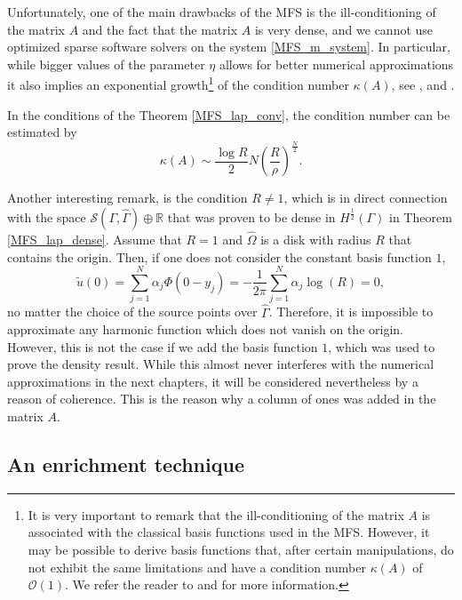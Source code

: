 Unfortunately, one of the main drawbacks of the \ac{MFS} is the ill-conditioning of the matrix \(A\) and the fact that the matrix \(A\) is very dense, and we cannot use optimized sparse software solvers on the system \eqref{MFS_m_system}. In particular, while bigger values of the parameter \(\eta\) allows for better numerical approximations it also implies an exponential growth\footnote{It is very important to remark that the ill-conditioning of the matrix \(A\) is associated with the classical basis functions used in the \ac{MFS}. However, it may be possible to derive basis functions that, after certain manipulations, do not exhibit the same limitations and have a condition number \(\kappa(A)\) of \(\mathcal{O}(1)\). We refer the reader to \cite{antunes2018reducing} and \cite{antunes2018numerical} for more information.} of the condition number \(\kappa(A)\), see \cite{christiansen1981condition}, \cite{kitagawa1988numerical} and \cite{kitagawa1991asymptotic}.
\begin{theorem}
    In the conditions of the Theorem \ref{MFS_lap_conv}, the condition number can be estimated by
    \[
        \kappa(A) \sim \frac{\log R}{2}N \left(\frac{R}{\rho}\right)^{\frac{N}{2}}.
    \]
\end{theorem}
Another interesting remark, is the condition \(R \neq 1\), which is in direct connection with the space \(\mathcal{S}(\Gamma, \hat{\Gamma}) \oplus \mathbb{R}\) that was proven to be dense in \(H^\frac{1}{2}(\Gamma)\) in Theorem \ref{MFS_lap_dense}. Assume that \(R=1\) and \(\hat{\Omega}\) is a disk with radius \(R\) that contains the origin. Then, if one does not consider the constant basis function \(1\),
\[
    \tilde{u}(0) = \sum_{j=1}^{N}\alpha_j \Phi(0-y_j) = -\frac{1}{2\pi}\sum_{j=1}^{N}\alpha_j \log(R) = 0,
\]
no matter the choice of the source points over \(\hat{\Gamma}\). Therefore, it is impossible to approximate any harmonic function which does not vanish on the origin. However, this is not the case if we add the basis function \(1\), which was used to prove the density result. While this almost never interferes with the numerical approximations in the next chapters, it will be considered nevertheless by a reason of coherence. This is the reason why a column of ones was added in the matrix \(A\).

\subsection{An enrichment technique}\label{m_particular_solutions}

